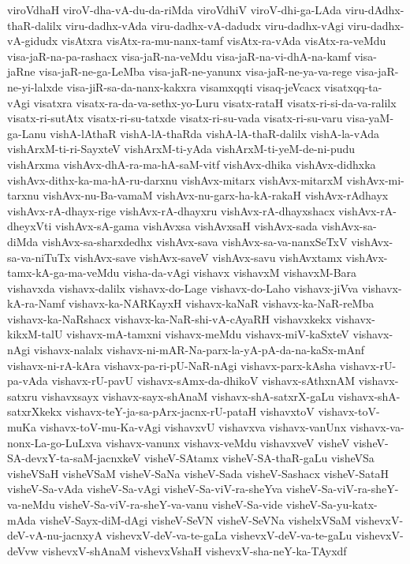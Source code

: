 {viroVdhaH
viroV-dha-vA-du-da-riMda
viroVdhiV
viroV-dhi-ga-LAda
viru-dAdhx-thaR-dalilx
viru-dadhx-vAda
viru-dadhx-vA-dadudx
viru-dadhx-vAgi
viru-dadhx-vA-gidudx
visAtxra
visAtx-ra-mu-nanx-tamf
visAtx-ra-vAda
visAtx-ra-veMdu
visa-jaR-na-pa-rashacx
visa-jaR-na-veMdu
visa-jaR-na-vi-dhA-na-kamf
visa-jaRne
visa-jaR-ne-ga-LeMba
visa-jaR-ne-yanunx
visa-jaR-ne-ya-va-rege
visa-jaR-ne-yi-lalxde
visa-jiR-sa-da-nanx-kakxra
visamxqqti
visaq-jeVcacx
visatxqq-ta-vAgi
visatxra
visatx-ra-da-va-sethx-yo-Luru
visatx-rataH
visatx-ri-si-da-va-ralilx
visatx-ri-sutAtx
visatx-ri-su-tatxde
visatx-ri-su-vada
visatx-ri-su-varu
visa-yaM-ga-Lanu
vishA-lAthaR
vishA-lA-thaRda
vishA-lA-thaR-dalilx
vishA-la-vAda
vishArxM-ti-ri-SayxteV
vishArxM-ti-yAda
vishArxM-ti-yeM-de-ni-pudu
vishArxma
vishAvx-dhA-ra-ma-hA-saM-vitf
vishAvx-dhika
vishAvx-didhxka
vishAvx-dithx-ka-ma-hA-ru-darxnu
vishAvx-mitarx
vishAvx-mitarxM
vishAvx-mi-tarxnu
vishAvx-nu-Ba-vamaM
vishAvx-nu-garx-ha-kA-rakaH
vishAvx-rAdhayx
vishAvx-rA-dhayx-rige
vishAvx-rA-dhayxru
vishAvx-rA-dhayxshacx
vishAvx-rA-dheyxVti
vishAvx-sA-gama
vishAvxsa
vishAvxsaH
vishAvx-sada
vishAvx-sa-diMda
vishAvx-sa-sharxdedhx
vishAvx-sava
vishAvx-sa-va-nanxSeTxV
vishAvx-sa-va-niTuTx
vishAvx-save
vishAvx-saveV
vishAvx-savu
vishAvxtamx
vishAvx-tamx-kA-ga-ma-veMdu
visha-da-vAgi
vishavx
vishavxM
vishavxM-Bara
vishavxda
vishavx-dalilx
vishavx-do-Lage
vishavx-do-Laho
vishavx-jiVva
vishavx-kA-ra-Namf
vishavx-ka-NARKayxH
vishavx-kaNaR
vishavx-ka-NaR-reMba
vishavx-ka-NaRshacx
vishavx-ka-NaR-shi-vA-cAyaRH
vishavxkekx
vishavx-kikxM-talU
vishavx-mA-tamxni
vishavx-meMdu
vishavx-miV-kaSxteV
vishavx-nAgi
vishavx-nalalx
vishavx-ni-mAR-Na-parx-la-yA-pA-da-na-kaSx-mAnf
vishavx-ni-rA-kAra
vishavx-pa-ri-pU-NaR-nAgi
vishavx-parx-kAsha
vishavx-rU-pa-vAda
vishavx-rU-pavU
vishavx-sAmx-da-dhikoV
vishavx-sAthxnAM
vishavx-satxru
vishavxsayx
vishavx-sayx-shAnaM
vishavx-shA-satxrX-gaLu
vishavx-shA-satxrXkekx
vishavx-teY-ja-sa-pArx-jacnx-rU-pataH
vishavxtoV
vishavx-toV-muKa
vishavx-toV-mu-Ka-vAgi
vishavxvU
vishavxva
vishavx-vanUnx
vishavx-va-nonx-La-go-LuLxva
vishavx-vanunx
vishavx-veMdu
vishavxveV
visheV
visheV-SA-devxY-ta-saM-jacnxkeV
visheV-SAtamx
visheV-SA-thaR-gaLu
visheVSa
visheVSaH
visheVSaM
visheV-SaNa
visheV-Sada
visheV-Sashacx
visheV-SataH
visheV-Sa-vAda
visheV-Sa-vAgi
visheV-Sa-viV-ra-sheYva
visheV-Sa-viV-ra-sheY-va-neMdu
visheV-Sa-viV-ra-sheY-va-vanu
visheV-Sa-vide
visheV-Sa-yu-katx-mAda
visheV-Sayx-diM-dAgi
visheV-SeVN
visheV-SeVNa
vishelxVSaM
vishevxV-deV-vA-nu-jacnxyA
vishevxV-deV-va-te-gaLa
vishevxV-deV-va-te-gaLu
vishevxV-deVvw
vishevxV-shAnaM
vishevxVshaH
vishevxV-sha-neY-ka-TAyxdf
}

